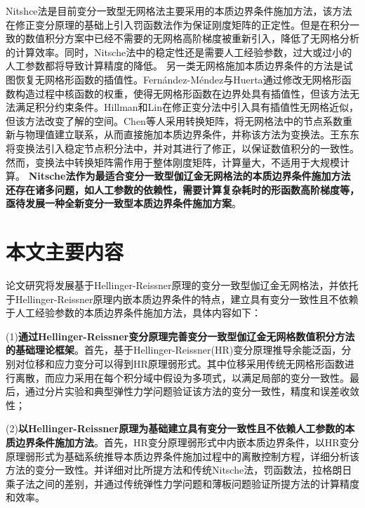 Nitshce法\textsuperscript{\cite{fernandez-mendez2004}}是目前变分一致型无网格法主要采用的本质边界条件施加方法，该方法在修正变分原理的基础上引入罚函数法作为保证刚度矩阵的正定性。但是在积分一致的数值积分方案中已经不需要的无网格高阶梯度被重新引入，降低了无网格分析的计算效率。同时，Nitsche法中的稳定性还是需要人工经验参数，过大或过小的人工参数都将导致计算精度的降低。
另一类无网格施加本质边界条件的方法是试图恢复无网格形函数的插值性。Fernández-Méndez与Huerta\textsuperscript{\cite{fernandez-mendez2004}}通过修改无网格形函数构造过程中核函数的权重，使得无网格形函数在边界处具有插值性，但该方法无法满足积分约束条件。Hillman和Lin\textsuperscript{\cite{hillman2021}}在修正变分法中引入具有插值性无网格近似，但该方法改变了解的空间。Chen等人\textsuperscript{\cite{chen1996}}采用转换矩阵，将无网格法中的节点系数重新与物理值建立联系，从而直接施加本质边界条件，并称该方法为变换法。王东东\textsuperscript{\cite{wang2015}}将变换法引入稳定节点积分法中，并对其进行了修正，以保证数值积分的一致性。然而，变换法中转换矩阵需作用于整体刚度矩阵，计算量大，不适用于大规模计算。
\textbf{Nitsche法作为最适合变分一致型伽辽金无网格法的本质边界条件施加方法还存在诸多问题，如人工参数的依赖性，需要计算复杂耗时的形函数高阶梯度等，亟待发展一种全新变分一致型本质边界条件施加方案}。
\section{本文主要内容}
论文研究将发展基于Hellinger-Reissner原理的变分一致型伽辽金无网格法，并依托于Hellinger-Reissner原理内嵌本质边界条件的特点，建立具有变分一致性且不依赖于人工经验参数的本质边界条件施加方法，具体内容如下：\par
(1)\textbf{通过Hellinger-Reissner变分原理完善变分一致型伽辽金无网格数值积分方法的基础理论框架}。首先，基于Hellinger-Reissner(HR)变分原理推导余能泛函，分别对位移和应力变分可以得到HR原理弱形式。其中位移采用传统无网格形函数进行离散，而应力采用在每个积分域中假设为多项式，以满足局部的变分一致性。最后，通过分片实验和典型弹性力学问题验证该方法的变分一致性，精度和误差收敛性；\par
(2)\textbf{以Hellinger-Reissner原理为基础建立具有变分一致性且不依赖人工参数的本质边界条件施加方法}。首先，HR变分原理弱形式中内嵌本质边界条件，以HR变分原理弱形式为基础系统推导本质边界条件施加过程中的离散控制方程，详细分析该方法的变分一致性。并详细对比所提方法和传统Nitsche法，罚函数法，拉格朗日乘子法之间的差别，并通过传统弹性力学问题和薄板问题验证所提方法的计算精度和效率。



